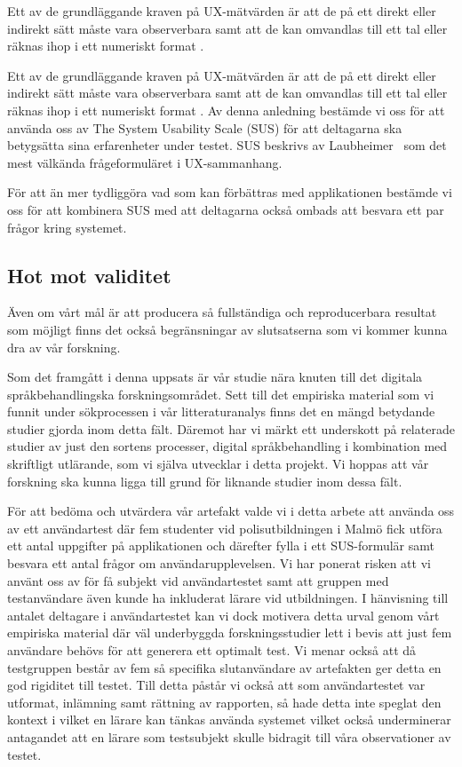 \documentclass[swedish]{maucsthesis}
\begin{document}
Ett av de grundläggande kraven på UX-mätvärden är att de på ett direkt eller
indirekt sätt måste vara observerbara samt att de kan omvandlas till ett tal
eller räknas ihop i ett numeriskt format \cite{tullis:2013}.

Ett av de grundläggande kraven på UX-mätvärden är att de på ett direkt eller
indirekt sätt måste vara observerbara samt att de kan omvandlas till ett tal
eller räknas ihop i ett numeriskt format \cite{tullis:2013}. Av denna anledning
bestämde vi oss för att använda oss av The System Usability Scale (SUS) för att
deltagarna ska betygsätta sina erfarenheter under testet. SUS beskrivs av
Laubheimer~\cite{laubheimer:2018} som det mest välkända frågeformuläret i UX-sammanhang.

För att än mer tydliggöra vad som kan förbättras med applikationen bestämde vi
oss för att kombinera SUS med att deltagarna också ombads att besvara ett par
frågor kring systemet.

\subsection{Hot mot validitet}

Även om vårt mål är att producera så fullständiga och reproducerbara resultat
som möjligt finns det också begränsningar av slutsatserna som vi kommer kunna
dra av vår forskning.

Som det framgått i denna uppsats är vår studie nära knuten till det
digitala språkbehandlingska forskningsområdet. Sett till det empiriska material som vi
funnit under sökprocessen i vår litteraturanalys finns det en mängd betydande
studier gjorda inom detta fält. Däremot har vi märkt ett underskott på
relaterade studier av just den sortens processer, digital språkbehandling i kombination
med skriftligt utlärande, som vi själva utvecklar i detta projekt. Vi
hoppas att vår forskning ska kunna ligga till grund för liknande studier inom
dessa fält.

För att bedöma och utvärdera vår artefakt valde vi i detta arbete att använda
oss av ett användartest där fem studenter vid polisutbildningen i Malmö fick
utföra ett antal uppgifter på applikationen och därefter fylla i ett
SUS-formulär samt besvara ett antal frågor om användarupplevelsen. Vi har
ponerat risken att vi använt oss av för få subjekt vid användartestet samt
att gruppen med testanvändare även kunde ha inkluderat lärare vid utbildningen.
I hänvisning till antalet deltagare i användartestet kan vi dock motivera detta
urval genom vårt empiriska material där väl underbyggda forskningsstudier lett i
bevis att just fem användare behövs för att generera ett optimalt test. Vi menar
också att då testgruppen består av fem så specifika slutanvändare av artefakten
ger detta en god rigiditet till testet. Till detta påstår vi också att som
användartestet var utformat, inlämning samt rättning av rapporten, så hade detta
inte speglat den kontext i vilket en lärare kan tänkas använda systemet vilket
också underminerar antagandet att en lärare som testsubjekt skulle bidragit till
våra observationer av testet.
\end{document}
